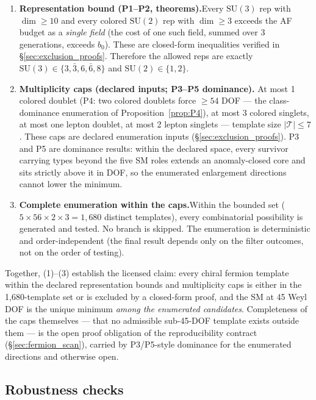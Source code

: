 \documentclass[11pt]{article}
\theoremstyle{definition}
\newcommand{\SU}{\mathrm{SU}}
\begin{document}
\begin{enumerate}[nosep]
\item \textbf{Representation bound (P1--P2, theorems).}\quad Every
$\SU(3)$ rep with $\dim \ge 10$ and every colored $\SU(2)$ rep with
$\dim \ge 3$ exceeds the AF budget as a \emph{single field} (the cost
of one such field, summed over 3 generations, exceeds $b_0$).  These
are closed-form inequalities verified in \S\ref{sec:exclusion_proofs}.
Therefore the allowed reps are exactly
$\SU(3) \in \{3,\bar{3},6,\bar{6},8\}$ and $\SU(2) \in \{1,2\}$.

\item \textbf{Multiplicity caps (declared inputs; P3--P5 dominance).}\quad
At most 1 colored doublet (P4: two colored doublets force $\ge 54$
DOF --- the class-dominance enumeration of
Proposition~\ref{prop:P4}), at most 3 colored singlets,
at most one lepton doublet, at most 2 lepton singlets --- template size
$|\mathcal{T}| \le 7$.  These caps are declared enumeration inputs
(\S\ref{sec:exclusion_proofs}).  P3 and P5 are dominance results:
within the declared space, every survivor carrying types beyond the
five SM roles extends an anomaly-closed core and sits strictly above
it in DOF, so the enumerated enlargement directions cannot lower the
minimum.

\item \textbf{Complete enumeration within the caps.}\quad Within the
bounded set ($5 \times 56 \times 2 \times 3 = 1{,}680$ distinct
templates), every combinatorial possibility is generated and tested.
No branch is skipped.  The enumeration is deterministic and
order-independent (the final result depends only on the filter
outcomes, not on the order of testing).
\end{enumerate}

\noindent Together, (1)--(3) establish the licensed claim: every
chiral fermion template within the declared representation bounds and
multiplicity caps is either in the 1{,}680-template set or is excluded
by a closed-form proof, and the SM at 45 Weyl DOF is the unique
minimum \emph{among the enumerated candidates}.  Completeness of the
caps themselves --- that no admissible sub-45-DOF template exists
outside them --- is the open proof obligation of the reproducibility
contract (\S\ref{sec:fermion_scan}), carried by P3/P5-style dominance
for the enumerated directions and otherwise open.

\subsection{Robustness checks}
\label{app:robustness}
\end{document}
